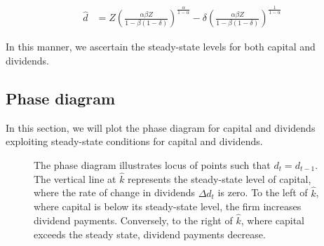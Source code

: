\documentclass[12pt]{report}
\begin{document}
\begin{align}
    \widehat{d} &= Z \left( \frac{\alpha \beta Z}{1 - \beta(1 - \delta)} \right)^{\frac{\alpha}{1 - \alpha}} - \delta \left( \frac{\alpha \beta Z}{1 - \beta(1 - \delta)} \right)^{\frac{1}{1 - \alpha}}
\end{align}



In this manner, we ascertain the steady-state levels for both capital and dividends.
\subsection{Phase diagram}

In this section, we will plot the phase diagram for capital and dividends exploiting steady-state conditions for capital and
dividends. 
\begin{figure}
    \centering
    \caption{The phase diagram illustrates locus of points such that \(d_t=d_{t-1}\). The vertical line at \( \hat{k} \) represents the steady-state level of capital, where
    the rate of change in dividends \( \Delta d_t \) is zero. To the left of \( \hat{k} \), where capital is below its
    steady-state level, the firm increases dividend payments. Conversely, to the right of \( \hat{k} \), where capital
    exceeds the steady state, dividend payments decrease.}
    \label{fig:ph_d_k_nod}
\end{figure}
\end{document}
